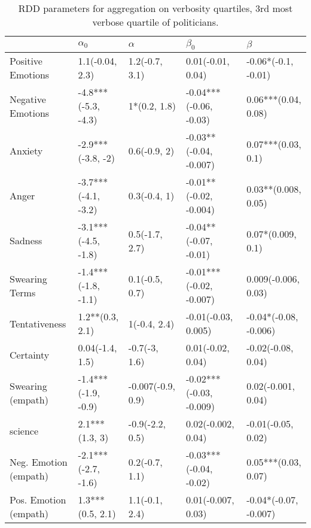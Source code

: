 \begin{table}[h]\centering
\begin{adjustbox}{width=\linewidth, center}
	\begin{tabular}{lllll}
	\toprule
	{} &           $\alpha_0$ &           $\alpha$ &                $\beta_0$ &                $\beta$ \\
	\midrule
	Positive Emotions     &      1.1(-0.04, 2.3) &     1.2(-0.7, 3.1) &        0.01(-0.01, 0.04) &    -0.06*(-0.1, -0.01) \\
	Negative Emotions     &  -4.8***(-5.3, -4.3) &       1*(0.2, 1.8) &   -0.04***(-0.06, -0.03) &    0.06***(0.04, 0.08) \\
	Anxiety               &    -2.9***(-3.8, -2) &       0.6(-0.9, 2) &   -0.03**(-0.04, -0.007) &     0.07***(0.03, 0.1) \\
	Anger                 &  -3.7***(-4.1, -3.2) &       0.3(-0.4, 1) &   -0.01**(-0.02, -0.004) &    0.03**(0.008, 0.05) \\
	Sadness               &  -3.1***(-4.5, -1.8) &     0.5(-1.7, 2.7) &    -0.04**(-0.07, -0.01) &      0.07*(0.009, 0.1) \\
	Swearing Terms        &  -1.4***(-1.8, -1.1) &     0.1(-0.5, 0.7) &  -0.01***(-0.02, -0.007) &    0.009(-0.006, 0.03) \\
	Tentativeness         &      1.2**(0.3, 2.1) &       1(-0.4, 2.4) &      -0.01(-0.03, 0.005) &  -0.04*(-0.08, -0.006) \\
	Certainty             &      0.04(-1.4, 1.5) &      -0.7(-3, 1.6) &        0.01(-0.02, 0.04) &     -0.02(-0.08, 0.04) \\
	Swearing (empath)     &  -1.4***(-1.9, -0.9) &  -0.007(-0.9, 0.9) &  -0.02***(-0.03, -0.009) &     0.02(-0.001, 0.04) \\
	science               &       2.1***(1.3, 3) &    -0.9(-2.2, 0.5) &       0.02(-0.002, 0.04) &     -0.01(-0.05, 0.02) \\
	Neg. Emotion (empath) &  -2.1***(-2.7, -1.6) &     0.2(-0.7, 1.1) &   -0.03***(-0.04, -0.02) &    0.05***(0.03, 0.07) \\
	Pos. Emotion (empath) &     1.3***(0.5, 2.1) &     1.1(-0.1, 2.4) &       0.01(-0.007, 0.03) &  -0.04*(-0.07, -0.007) \\
	\bottomrule
	\end{tabular}
	
\end{adjustbox}
	\caption{RDD parameters for aggregation on verbosity quartiles, 3rd most verbose quartile of politicians.}
	\label{fig: Verbosity_5}
\end{table}

